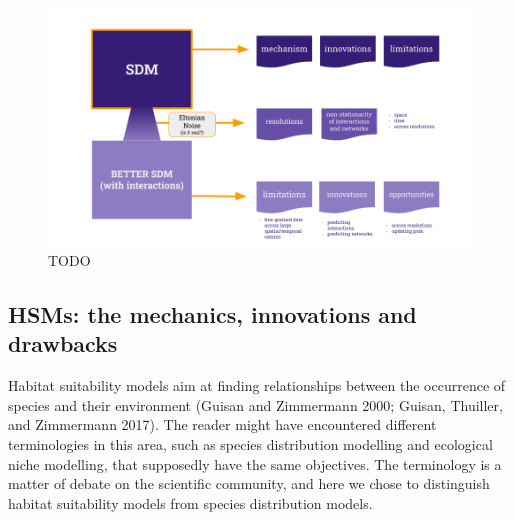 \documentclass[11pt]{article}
\makeatletter
\def\maxwidth{\ifdim\Gin@nat@width>\linewidth\linewidth
\else\Gin@nat@width\fi}
\let\Oldincludegraphics\includegraphics
\renewcommand{\includegraphics}[1]{\Oldincludegraphics[width=\maxwidth]{#1}}
\makeatother
\begin{document}
\begin{figure}
\centering
\includegraphics{figures/concept.png}
\caption{TODO}
\end{figure}

\hypertarget{hsms-the-mechanics-innovations-and-drawbacks}{%
\subsection{HSMs: the mechanics, innovations and
drawbacks}\label{hsms-the-mechanics-innovations-and-drawbacks}}

Habitat suitability models aim at finding relationships between the
occurrence of species and their environment (Guisan and Zimmermann 2000;
Guisan, Thuiller, and Zimmermann 2017). The reader might have
encountered different terminologies in this area, such as species
distribution modelling and ecological niche modelling, that supposedly
have the same objectives. The terminology is a matter of debate on the
scientific community, and here we chose to distinguish habitat
suitability models from species distribution models.
\end{document}
